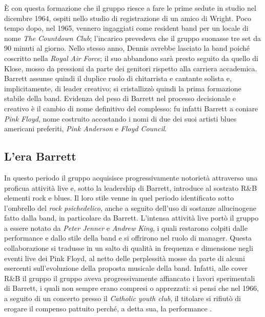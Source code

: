 \documentclass[class=book, crop=false, oneside, 12pt]{standalone}
\begin{document}
    È con questa formazione che il gruppo riesce a fare le prime sedute in studio nel dicembre 1964, ospiti nello studio di registrazione di un amico di Wright. Poco tempo dopo, nel 1965, vennero ingaggiati come resident band per un locale di nome \emph{The Countdown Club}; l'incarico prevedeva che il gruppo suonasse tre set da 90 minuti al giorno. Nello stesso anno, Dennis avrebbe lasciato la band poiché coscritto nella \emph{Royal Air Force}; il suo abbandono sarà presto seguito da quello di Klose, mosso da pressioni da parte dei genitori rispetto alla carriera accademica. Barrett assunse quindi il duplice ruolo di chitarrista e cantante solista e, implicitamente, di leader creativo; si cristallizzò  quindi la prima formazione stabile della band. Evidenza del peso di Barrett nel processo decisionale e creativo è il cambio di nome definitivo del complesso: fu infatti Barrett a coniare \emph{Pink Floyd}, nome costruito accostando i nomi di due dei suoi artisti blues americani preferiti, \emph{Pink Anderson} e \emph{Floyd Council}.
    
    \subsection{L'era Barrett}
    In questo periodo il gruppo acquisisce progressivamente notorietà attraverso una proficua attività live e, sotto la leadership di Barrett, introduce al sostrato R\&B elementi rock e blues. Il loro stile venne in quel periodo identificato sotto l'ombrello del \emph{rock psichedelico}, anche a seguito dell'uso di sostanze allucinogene fatto dalla band, in particolare da Barrett. L'intensa attività live portò il gruppo a essere notato da \emph{Peter Jenner} e \emph{Andrew King}, i quali restarono colpiti dalle performance e dallo stile della band e si offrirono nel ruolo di manager. Questa collaborazione si tradusse in un salto di qualità in frequenza e dimensione negli eventi live dei Pink Floyd, al netto delle perplessità mosse da parte di alcuni esercenti sull'evoluzione della proposta musicale della band. Infatti, alle cover R\&B il gruppo  il gruppo aveva progressivamente affiancato i lavori sperimentali di Barrett, i quali non sempre erano compresi o apprezzati: si pensi che nel 1966, a seguito di un concerto presso il \emph{Catholic youth club}, il titolare si rifiutò di erogare il compenso pattuito perché, a detta sua, la performance . {%
    \parfillskip=0pt
    \parskip=0pt
    \par}
    
\end{document}
